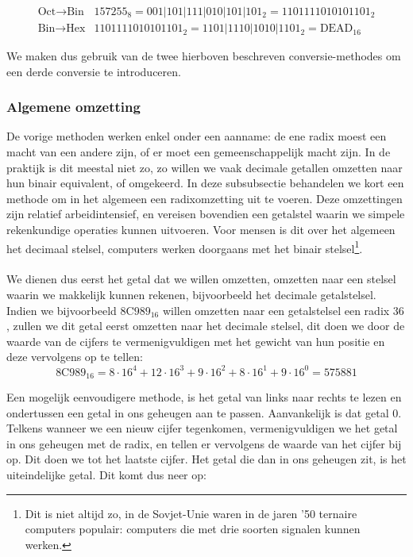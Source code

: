 \begin{equation}
\begin{array}{ll}
\mbox{Oct$\rightarrow$Bin}&157255_8=001|101|111|010|101|101_2=1101111010101101_2\\
\mbox{Bin$\rightarrow$Hex}&1101111010101101_2=1101|1110|1010|1101_2=\mbox{DEAD}_{16}
\end{array}
\end{equation}

We maken dus gebruik van de twee hierboven beschreven conversie-methodes om een derde conversie te introduceren.

\subsubsection{Algemene omzetting}
De vorige methoden werken enkel onder een aanname: de ene radix moest een macht van een andere zijn, of er moet een gemeenschappelijk macht zijn. In de praktijk is dit meestal niet zo, zo willen we vaak decimale getallen omzetten naar hun binair equivalent, of omgekeerd. In deze subsubsectie behandelen we kort een methode om in het algemeen een radixomzetting uit te voeren. Deze omzettingen zijn relatief arbeidintensief, en vereisen bovendien een getalstel waarin we simpele rekenkundige operaties kunnen uitvoeren. Voor mensen is dit over het algemeen het decimaal stelsel, computers werken doorgaans met het binair stelsel\footnote{Dit is niet altijd zo, in de Sovjet-Unie waren in de jaren '50 ternaire computers populair: computers die met drie soorten signalen kunnen werken.}.

\paragraph{}
We dienen dus eerst het getal dat we willen omzetten, omzetten naar een stelsel waarin we makkelijk kunnen rekenen, bijvoorbeeld het decimale getalstelsel. Indien we bijvoorbeeld $\mbox{8C989}_{16}$ willen omzetten naar een getalstelsel een radix $36$, zullen we dit getal eerst omzetten naar het decimale stelsel, dit doen we door de waarde van de cijfers te vermenigvuldigen met het gewicht van hun positie en deze vervolgens op te tellen:
\begin{equation}
\mbox{8C989}_{16}=8\cdot 16^4+12\cdot 16^3+9\cdot 16^2+8\cdot 16^1+9\cdot 16^0=575881
\end{equation}

Een mogelijk eenvoudigere methode, is het getal van links naar rechts te lezen en ondertussen een getal in ons geheugen aan te passen. Aanvankelijk is dat getal $0$. Telkens wanneer we een nieuw cijfer tegenkomen, vermenigvuldigen we het getal in ons geheugen met de radix, en tellen er vervolgens de waarde van het cijfer bij op. Dit doen we tot het laatste cijfer. Het getal die dan in ons geheugen zit, is het uiteindelijke getal. Dit komt dus neer op:

